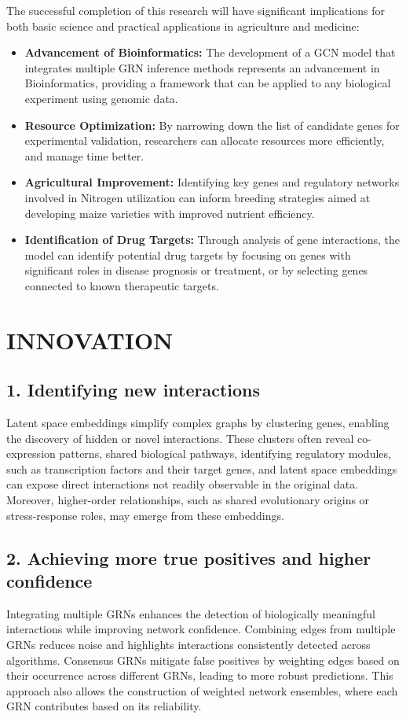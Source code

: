 \documentclass{article}
\begin{document}
The successful completion of this research will have significant implications for both basic science and practical applications in agriculture and medicine:
\begin{itemize}
    \item \textbf{Advancement of Bioinformatics:} The development of a GCN model that  integrates multiple GRN inference methods represents an  advancement in Bioinformatics, providing a framework that can be applied to any biological experiment using genomic data.
    \item \textbf{Resource Optimization:} By narrowing down the list of candidate genes for experimental validation, researchers can allocate resources more efficiently, and manage time better.
    \item \textbf{Agricultural Improvement:} Identifying key genes and regulatory networks involved in Nitrogen utilization can inform breeding strategies aimed at developing maize varieties with improved nutrient efficiency.
    \item \textbf{Identification of Drug Targets:} Through analysis of gene interactions, the model can identify potential drug targets by focusing on genes with significant roles in disease prognosis or treatment, or by selecting genes connected to known therapeutic targets.
\end{itemize}

\section{INNOVATION}
\subsection*{1. Identifying new interactions}
Latent space embeddings simplify complex graphs by clustering genes, enabling the discovery of hidden or novel interactions. These clusters often reveal co-expression patterns, shared biological pathways, identifying regulatory modules, such as transcription factors and their target genes, and latent space embeddings can expose direct interactions not readily observable in the original data. Moreover, higher-order relationships, such as shared evolutionary origins or stress-response roles, may emerge from these embeddings. 

\subsection*{2. Achieving more true positives and higher confidence}
Integrating multiple GRNs enhances the detection of biologically meaningful interactions while improving network confidence. Combining edges from multiple GRNs reduces noise and highlights interactions consistently detected across algorithms. Consensus GRNs mitigate false positives by weighting edges based on their occurrence across different GRNs, leading to more robust predictions. This approach also allows the construction of weighted network ensembles, where each GRN contributes based on its reliability.
\end{document}
